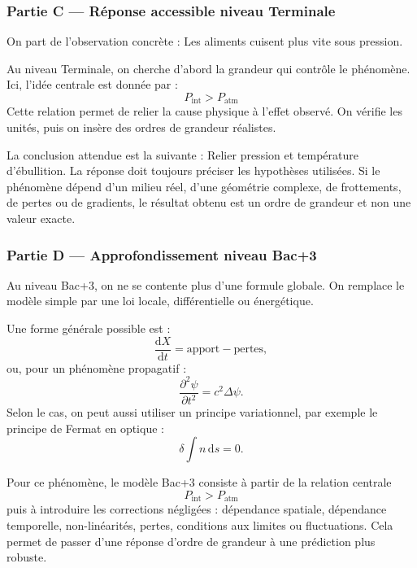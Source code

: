 \documentclass[11pt,a4paper]{article}
\begin{document}
\subsubsection*{Partie C — Réponse accessible niveau Terminale}

\begin{corrigebox}
On part de l'observation concrète : Les aliments cuisent plus vite sous pression.

Au niveau Terminale, on cherche d'abord la grandeur qui contrôle le phénomène. Ici, l'idée centrale est donnée par :
\[
P_{\mathrm{int}}>P_{\mathrm{atm}}
\]
Cette relation permet de relier la cause physique à l'effet observé. On vérifie les unités, puis on insère des ordres de grandeur réalistes.

La conclusion attendue est la suivante : Relier pression et température d'ébullition. La réponse doit toujours préciser les hypothèses utilisées. Si le phénomène dépend d'un milieu réel, d'une géométrie complexe, de frottements, de pertes ou de gradients, le résultat obtenu est un ordre de grandeur et non une valeur exacte.
\end{corrigebox}

\subsubsection*{Partie D — Approfondissement niveau Bac+3}

\begin{approfondissementbox}
Au niveau Bac+3, on ne se contente plus d'une formule globale. On remplace le modèle simple par une loi locale, différentielle ou énergétique.

Une forme générale possible est :
\[
\frac{\mathrm d X}{\mathrm dt}=\text{apport}-\text{pertes},
\]
ou, pour un phénomène propagatif :
\[
\frac{\partial^2 \psi}{\partial t^2}=c^2\Delta\psi.
\]
Selon le cas, on peut aussi utiliser un principe variationnel, par exemple le principe de Fermat en optique :
\[
\delta \int n\,\mathrm ds=0.
\]

Pour ce phénomène, le modèle Bac+3 consiste à partir de la relation centrale
\[
P_{\mathrm{int}}>P_{\mathrm{atm}}
\]
puis à introduire les corrections négligées : dépendance spatiale, dépendance temporelle, non-linéarités, pertes, conditions aux limites ou fluctuations. Cela permet de passer d'une réponse d'ordre de grandeur à une prédiction plus robuste.
\end{approfondissementbox}
\end{document}
